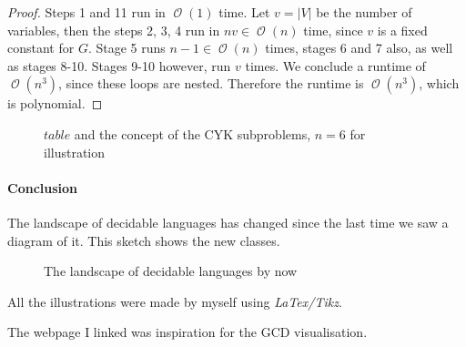 \documentclass[10pt,fleqn]{article}
\theoremstyle{definition}
\theoremstyle{remark}
\newcommand{\pclass}{\text{P}}
\newcommand{\pathprob}{\text{PATH}}
\newcommand{\relprimeprob}{\text{RELPRIME}}
\newcommand{\cflclass}{\text{CFL}}
\DeclareMathOperator{\onot}{\mathcal{O}}
\begin{document}
\begin{proof}
Steps 1 and 11 run in \(\onot{(1)}\) time. Let \(v = |V|\) be the number of variables, then the steps 2, 3, 4 run in \(nv \in \onot{(n)}\) time, since \(v\) is a fixed constant for \(G\). Stage 5 runs \(n-1\in\onot{(n)}\) times, stages 6 and 7 also, as well as stages 8-10. Stages 9-10 however, run \(v\) times. We conclude a runtime of \(\onot{(n^3)}\), since these loops are nested. Therefore the runtime is \(\onot{(n^3)}\), which is polynomial.
\end{proof}
\begin{figure}[!hbtp]
    \centering
    \caption{\(table\) and the concept of the CYK subproblems, \(n = 6\) for illustration}
\end{figure}

\newpage

\paragraph*{Conclusion} The landscape of decidable languages has changed since the last time we saw a diagram of it. This sketch shows the new classes.
\begin{figure}[!htbp]
    \large
    \centering
    \caption{The landscape of decidable languages by now}
\end{figure}

\nocite{*}
\renewcommand{\refname}{\normalsize References} 



All the illustrations were made by myself using \emph{LaTex/Tikz}.

The webpage I linked was inspiration for the GCD visualisation.
\end{document}

